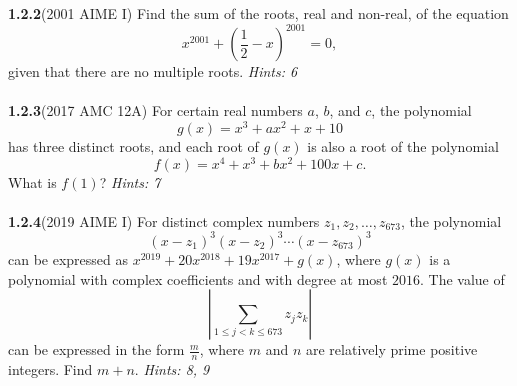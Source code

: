 \documentclass[12pt]{article}
\begin{document}
\textbf{1.2.2}\quad (2001 AIME I) Find the sum of the roots, real and non-real, of the equation \[x^{2001}+\left(\frac 12-x\right)^{2001}=0,\]  given that there are no multiple roots. \textit{Hints: 6}\\\\
\textbf{1.2.3}\quad (2017 AMC 12A) For certain real numbers $a$, $b$, and $c$, the polynomial\[g(x) = x^3 + ax^2 + x + 10\] has three distinct roots, and each root of $g(x)$ is also a root of the polynomial\[f(x) = x^4 + x^3 + bx^2 + 100x + c.\]What is $f(1)$? \textit{Hints: 7}\\\\
\textbf{1.2.4}\quad (2019 AIME I) For distinct complex numbers $z_1,z_2,\dots,z_{673}$, the polynomial\[(x-z_1)^3(x-z_2)^3 \cdots (x-z_{673})^3\]can be expressed as $x^{2019} + 20x^{2018} + 19x^{2017}+g(x)$, where $g(x)$ is a polynomial with complex coefficients and with degree at most $2016$. The value of\[\left| \sum_{1 \le j <k \le 673} z_jz_k \right|\]can be expressed in the form $\tfrac{m}{n}$, where $m$ and $n$ are relatively prime positive integers. Find $m+n$. \textit{Hints: 8, 9}\\\\
\end{document}
